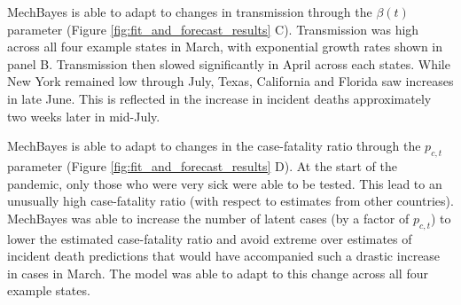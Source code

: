 \documentclass[11pt]{amsart}
\begin{document}
MechBayes is able to adapt to changes in transmission through the $\beta(t)$ parameter (Figure \ref{fig:fit_and_forecast_results} C). Transmission was high across all four example states in March, with exponential growth rates shown in panel B. Transmission then slowed significantly in April across each states. While New York remained low through July, Texas, California and Florida saw increases in late June. This is reflected in the increase in incident deaths approximately two weeks later in mid-July.


MechBayes is able to adapt to changes in the case-fatality ratio through the $p_{c,t}$ parameter (Figure \ref{fig:fit_and_forecast_results} D). At the start of the pandemic, only those who were very sick were able to be tested. This lead to an unusually high case-fatality ratio (with respect to estimates from other countries). MechBayes was able to increase the number of latent cases (by a factor of $p_{c,t}$) to lower the estimated case-fatality ratio and avoid extreme over estimates of incident death predictions that would have accompanied such a drastic increase in cases in March. The model was able to adapt to this change across all four example states. 




\end{document}
